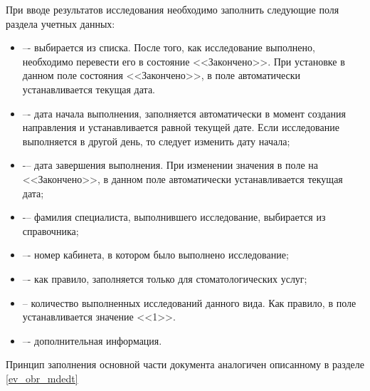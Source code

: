 {{При вводе результатов исследования необходимо заполнить следующие поля раздела учетных данных:
\begin{itemize}
 \item {} –- выбирается из списка. После того, как  исследование выполнено, необходимо перевести его в состояние <<Закончено>>. При установке в данном поле состояния <<Закончено>>, в поле  автоматически устанавливается текущая дата.
 \item {} –- дата начала выполнения, заполняется автоматически в момент создания направления и устанавливается равной текущей дате. Если исследование выполняется в другой день, то следует изменить дату начала;
 \item {} -– дата завершения выполнения. При изменении значения в поле  на <<Закончено>>, в данном поле автоматически устанавливается текущая дата;
 \item {} -– фамилия специалиста, выполнившего исследование, выбирается из справочника;
 \item {} –- номер кабинета, в котором было выполнено исследование;
 \item {} –- как правило, заполняется только для стоматологических услуг;
 \item {} -- количество выполненных исследований данного вида. Как правило, в поле устанавливается значение <<1>>.
 \item {} –- дополнительная информация.
\end{itemize}

Принцип заполнения основной части документа аналогичен описанному в разделе \ref{ev_obr_mdedt}



}}

